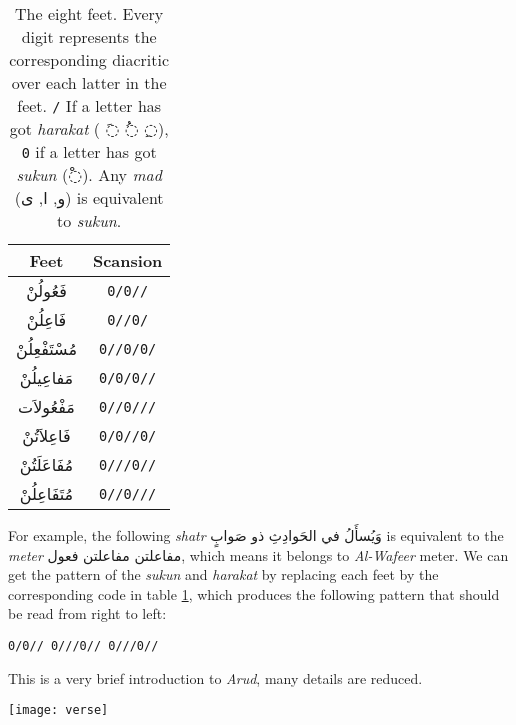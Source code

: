 \documentclass[12pt]{report}
\begin{document}
\begin{table}[!t]
  \centering
  \begin{tabular}{|c|c|} 
    \hline
    \textbf{Feet} & \textbf{Scansion} \\ 
    \hline
    \textarabic{فَعُولُنْ}  & \texttt{0/0//}\\
    \textarabic{فَاعِلُنْ}  & \texttt{0//0/}\\
    \textarabic{مُسْتَفْعِلُنْ}& \texttt{0//0/0/}\\
    \textarabic{مَفاعِيلُنْ}& \texttt{0/0/0//}\\
    \textarabic{مَفْعُولاَت} & \texttt{0//0///}\\
    \textarabic{فَاعِلاَتُنْ} & \texttt{0/0//0/}\\
    \textarabic{مُفَاعَلَتُنْ}& \texttt{0///0//}\\
    \textarabic{مُتَفَاعِلُنْ}& \texttt{0//0///}\\
    \hline
  \end{tabular}
  \caption{The eight feet. Every digit represents the corresponding diacritic
over each latter in the feet. \texttt{/} If a letter has got \textit{harakat} (
\textarabic{◌َ} \textarabic{◌ُ} \textarabic{◌ِ}), \texttt{0} if a letter has got
\textit{sukun} (\textarabic{◌ْ}). Any \textit{mad} (\textarabic{و, ا, ى}) is
equivalent to \textit{sukun}.}\label{arud:feet}
\end{table}


For example, the following \textit{shatr} \textarabic{وَيُسأَلُ في الحَوادِثِ ذو صَوابٍ} is
equivalent to the \textit{meter} \textarabic{مفاعلتن مفاعلتن فعول}, which means
it belongs to \textit{Al-Wafeer} meter. We can get the pattern of the
\textit{sukun} and \textit{harakat} by replacing each feet by the corresponding
code in table \ref{arud:feet}, which produces the following pattern that should
be read from right to left:%
\begin{flushright}
  {\texttt{0/0// 0///0// 0///0//}} %
\end{flushright}
This is a very brief introduction to \textit{Arud}, many details are reduced.


\begin{center}
\texttt{[image: verse]}
\end{center}


 
\end{document}
